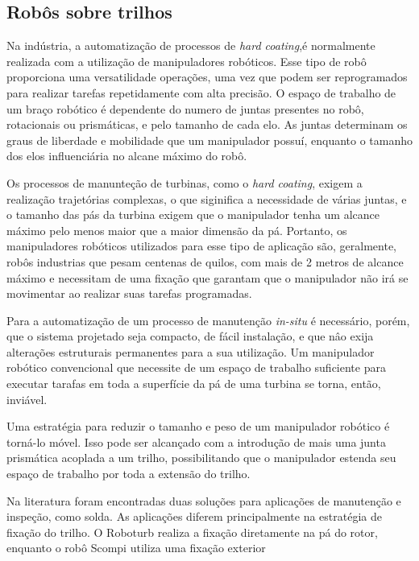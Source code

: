 \subsection{Robôs sobre trilhos}


Na indústria, a automatização de processos de \textit{hard coating},é
normalmente realizada com a utilização de manipuladores robóticos. Esse tipo de
robô proporciona uma versatilidade operações, uma vez que podem ser
reprogramados para realizar tarefas repetidamente com alta precisão. O espaço de
trabalho de um braço robótico é dependente do numero de juntas presentes no
robô, rotacionais ou prismáticas, e pelo tamanho de cada elo. As juntas
determinam os graus de liberdade e mobilidade que um manipulador possuí,
enquanto o tamanho dos elos influenciária no alcane máximo do robô.

Os processos de manunteção de turbinas, como o \textit{hard coating}, exigem a
realização trajetórias complexas, o que siginifica a necessidade de várias
juntas, e o tamanho das pás da turbina exigem que o manipulador tenha um alcance
máximo pelo menos maior que a maior dimensão da pá. Portanto, os manipuladores
robóticos utilizados para esse tipo de aplicação são, geralmente, robôs
industrias que pesam centenas de quilos, com mais de 2 metros de alcance máximo
e necessitam de uma fixação que garantam que o manipulador não irá se movimentar
ao realizar suas tarefas programadas. 

Para a automatização de um processo de manutenção \textit{in-situ} é
necessário, porém, que o sistema projetado seja compacto, de fácil instalação, e
que nâo exija alterações estruturais permanentes para a sua utilização. Um
manipulador robótico convencional que necessite de um espaço de trabalho
suficiente para executar tarafas em toda a superfície da pá de uma turbina se
torna, então, inviável. 

Uma estratégia para reduzir o tamanho e peso de um manipulador robótico é
torná-lo móvel. Isso pode ser alcançado com a introdução de mais uma junta
prismática acoplada a um trilho, possibilitando que o manipulador estenda seu
espaço de trabalho por toda a extensão do trilho.

Na literatura foram encontradas duas soluções para aplicações de manutenção e
inspeção, como solda. As aplicações diferem principalmente na estratégia de
fixação do trilho. O Roboturb \cite{roboturb} realiza a fixação diretamente na
pá do rotor, enquanto o robô Scompi \cite{scompi} utiliza uma fixação exterior 


